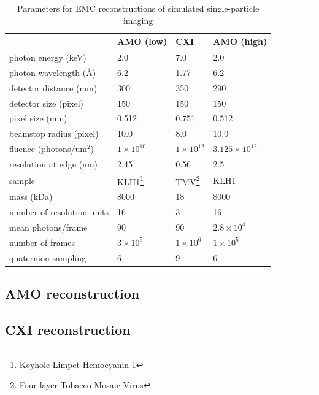 \documentclass[]{iucr}              %
\begin{document}
\begin{table}
\caption{Parameters for EMC reconstructions of simulated single-particle imaging} \label{table:simParams}
\label{parameters}
\begin{tabular}{p{3.3cm} p{1.4cm} p{1.4cm} p{1.4cm}}
                        & AMO (low)           & CXI              & AMO (high)\\
\hline
photon energy (keV)     & 2.0                 & 7.0              & 2.0 \\
photon wavelength (\AA)	& 6.2                 & 1.77             & 6.2 \\
detector distance (mm)  & 300                 & 350              & 290 \\
detector size (pixel)   & 150                 & 150              & 150 \\
pixel size (mm)         & 0.512               & 0.751            & 0.512 \\
beamstop radius (pixel) & 10.0                & 8.0              & 10.0 \\
fluence (photons/um$^2$)& $1\times10^{10}$    & $1\times10^{12}$ & $3.125\times10^{12}$ \\
resolution at edge (nm) & 2.45                & 0.56             & 2.5 \\
\hline
sample                  & KLH1\footnote{Keyhole Limpet Hemocyanin 1}& TMV\footnote{Four-layer Tobacco Mosaic Virus}& KLH1$^\dagger$ \\
mass (kDa)	            & 8000                & 18               & 8000 \\
number of resolution units& 16                & 3                & 16 \\
mean photons/frame      & 90                  & 90               & $2.8\times10^{4}$ \\
number of frames        & $3\times10^5$       & $1\times10^6$    & $1\times10^5$ \\
quaternion sampling     & 6                   & 9                & 6 \\

\end{tabular}
\end{table}

\subsection{AMO reconstruction}
\subsection{CXI reconstruction}
\end{document}
